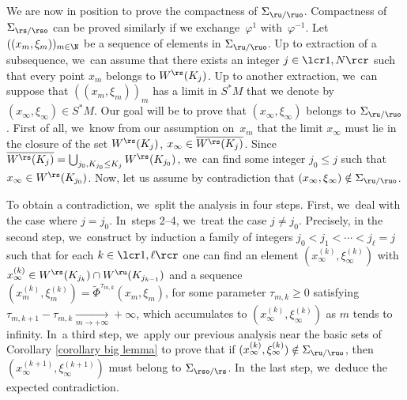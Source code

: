We are now in position to prove the compactness of $\Sigma_{\ru/\ruo}$. Compactness of $\Sigma_{\rs/\rso}$ can be proved similarly if we exchange~$\varphi^1$ with~$\varphi^{-1}$. Let $((x_m, \xi_m))_{m \in \N}$ be a sequence of elements in $\Sigma_{\ru/\ruo}$. Up to extraction of a subsequence, we~can assume that there exists an integer $j\in\lcr1,N\rcr$ such that every point $x_m$ belongs to $W^\rs (K_j)$. Up to another extraction, we~can suppose that $((x_m,\xi_m))_m$ has a limit in $S^*M$ that we denote by $(x_{\infty},\xi_{\infty}) \in S^*M$. Our goal will be to prove that $(x_{\infty}, \xi_{\infty})$ belongs to $\Sigma_{\ru/\ruo}$. First of all, we~know from our assumption on~$x_m$ that the limit $x_{\infty}$ must lie in the closure of the set $ W^\rs (K_j)$, \ie $x_{\infty} \in \overline{W^\rs (K_j)}$. Since $\overline{W^\rs (K_j)} = \bigcup_{j_0, K_{j_0} \leq K_j} W^\rs (K_{j_0})$, we~can find some integer $j_0 \leq j$ such that $x_{\infty} \in W^\rs (K_{j_0})$. Now, let us assume by contradiction that $(x_{\infty},\xi_{\infty}) \notin \Sigma_{\ru/\ruo}$.

To obtain a contradiction, we~split the analysis in four steps. First, we~deal with the case where $j = j_0$. In~steps 2--4, we~treat the case $j \neq j_0$. Precisely, in the second step, we~construct by induction a family of integers $j_0 < j_1 < \cdots < j_{\ell} = j$ such that for each $k\in\lcr1,\ell\rcr$ one can find an element $(x_{\infty}^{(k)}, \xi_{\infty}^{(k)})$ with $x_{\infty}^{(k)} \in W^\rs (K_{j_k}) \cap W^\ru (K_{j_{k-1}})$ and a sequence $(x_m^{(k)},\xi_m^{(k)}) = \widetilde{\Phi}^{\tau_{m,k}} (x_m,\xi_m)$, for some parameter $ \tau_{m,k} \geq 0$ satisfying $\tau_{m,k +1} - \tau_{m,k} \underset{m\to+\infty}{\to} + \infty$, which accumulates to $(x_{\infty}^{(k)},\xi_{\infty}^{(k)})$ as $m$ tends to infinity. In~a third step, we~apply our previous analysis near the basic sets of Corollary \ref{corollary big lemma} to prove that if $(x_{\infty}^{(k)},\xi_{\infty}^{(k)}) \notin \Sigma_{\ru/\ruo}$, then $(x_{\infty}^{(k+1)}, \xi_{\infty}^{(k+1)})$ must belong to $\Sigma_{\rso/\rs}$. In~the last step, we~deduce the expected contradiction.

